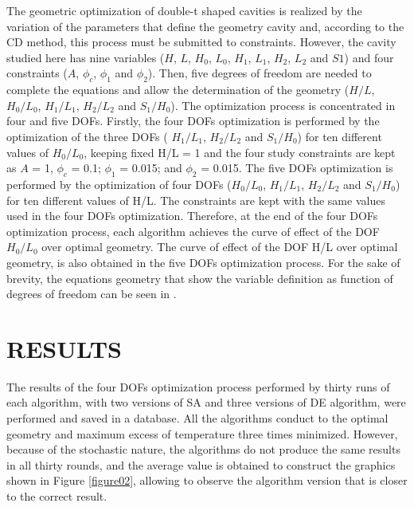 \documentclass[10pt,fleqn,a4paper,twoside]{article}
\begin{document}
The geometric optimization of double-t shaped cavities is realized by the variation of the parameters that define the geometry cavity and, according to the CD method, this process must be submitted to constraints. However, the cavity studied here has nine variables ($H$, $L$, $H_{0}$, $L_{0}$, $H_{1}$, $L_{1}$, $H_{2}$, $L_{2}$ and $S1$) and four constraints ($A$, $\phi_{c}$, $\phi_{1}$ and $\phi_{2}$). Then, five degrees of freedom are needed to complete the equations and allow the determination of the geometry ($H/L$, $H_{0}/L_{0}$, $H_{1}/L_{1}$, $H_{2}/L_{2}$ and $S_{1}/H_{0}$). The optimization process is concentrated in four and five DOFs. Firstly, the four DOFs optimization is performed by the optimization of the three DOFs ( $H_{1}/L_{1}$, $H_{2}/L_{2}$ and $S_{1}/H_{0}$) for ten different values of $H_{0}/L_{0}$,  keeping fixed  H/L = 1 and the four study constraints are kept as $A$ = 1, $\phi_{c}$ = 0.1; $\phi_{1}$ = 0.015; and $\phi_{2}$ = 0.015. The five DOFs optimization is performed by the optimization of four DOFs ($H_{0}/L_{0}$, $H_{1}/L_{1}$, $H_{2}/L_{2}$ and $S_{1}/H_{0}$) for ten different values of H/L.  The constraints are kept with the same values used in the four  DOFs optimization. Therefore, at the end of the four  DOFs optimization process, each algorithm achieves the curve of effect of the DOF  $H_{0}/L_{0}$ over optimal geometry. The curve of effect of the DOF H/L over optimal geometry, is also obtained in the five DOFs optimization process. For the sake of brevity, the equations geometry that show the variable definition as function of degrees of freedom can be seen in \cite{Gonzales2015b}.

\section{RESULTS}

The results of the four DOFs optimization process performed by thirty runs of each algorithm, with two versions of SA and three versions of DE algorithm, were performed and saved in a database. All the algorithms conduct to the optimal geometry and maximum excess of temperature three times minimized. However, because of the stochastic nature, the algorithms do not produce the same results in all thirty rounds, and the average value is obtained to construct the graphics shown in Figure \ref{figure02}, allowing to observe the algorithm version that is closer to the correct result.
\end{document}
